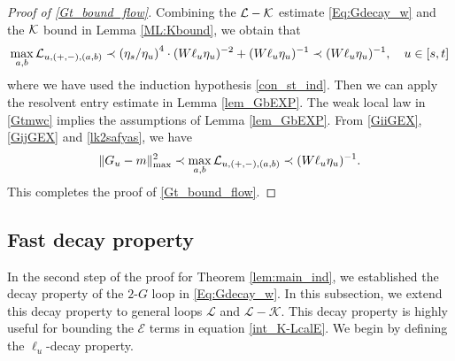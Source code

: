 \documentclass[10pt,reqno]{article}
\theoremstyle{plain} %
\theoremstyle{remark}
\numberwithin{equation}{section}
\begin{document}
 

\noindent 
\begin{proof}[Proof of \eqref{Gt_bound_flow}] Combining  the $\cal L-\cal K$ estimate  \eqref{Eq:Gdecay_w} and the $\cal K$ bound in Lemma \ref{ML:Kbound}, we obtain that
\begin{equation}
\label{lk2safyas}
 \max_{a, b}{\cal L }_{u, (+,-), (a,b)}\prec \left(\eta_s/\eta_u\right)^4\cdot (W\ell_u\eta_u)^{-2}+(W\ell_u\eta_u)^{-1}\prec (W\ell_u\eta_u)^{-1}  ,\quad u\in [s,t]    
\end{equation}
where we have used the induction hypothesis  \eqref{con_st_ind}. 
Then we can apply  the resolvent entry estimate in Lemma \ref{lem_GbEXP}.  The weak local law in \eqref{Gtmwc} implies the assumptions of  Lemma \ref{lem_GbEXP}. From \eqref{GiiGEX}, \eqref{GijGEX} and  \eqref{lk2safyas}, we have 
$$
\|G_u-m\|^2_{\max}\prec  \max_{a, b}{\cal L }_{u, (+,-), (a,b)}\prec (W\ell_u\eta_u)^{-1} .
$$
This completes the proof of \eqref{Gt_bound_flow}.   
\end{proof}

  
\subsection{Fast decay property}
In the second step of the proof for Theorem \ref{lem:main_ind}, we established the decay property of the $2\text{-}G$ loop in \eqref{Eq:Gdecay_w}. In this subsection, we extend this decay property to general loops $\mathcal{L}$ and $\mathcal{L} - \mathcal{K}$. This decay property is highly useful for bounding the $\mathcal{E}$ terms in equation \eqref{int_K-LcalE}. We begin by defining the $\ell_u$-decay property.
\end{document}
